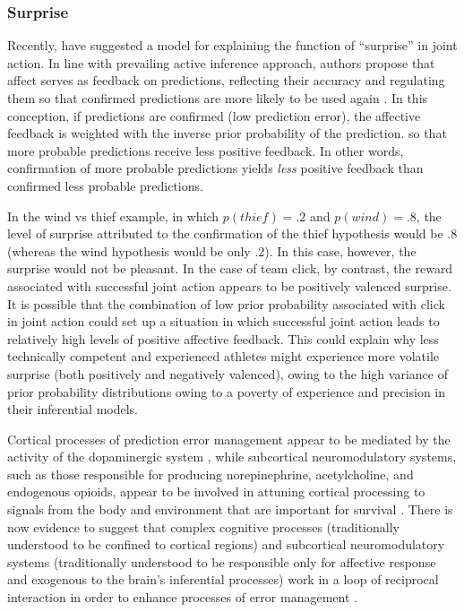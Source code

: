\begin{CJK}{UTF8}{gbsn}
\subsubsection{Surprise}
Recently, \textcite{Chetverikov2016} have suggested a model for explaining the function of ``surprise'' in joint action.  In line with prevailing active inference approach, authors propose that affect serves as feedback on predictions, reflecting their accuracy and regulating them so that confirmed predictions are more likely to be used again \citep{Chetverikov2014}. In this conception, if predictions are confirmed (low prediction error), the affective feedback is weighted with the inverse prior probability of the prediction.
 so that more probable predictions receive less positive feedback. In other words, confirmation of more probable predictions yields \textit{less} positive feedback than confirmed less probable predictions.

In the wind vs thief example, in which $p(thief) = .2$ and $p(wind) = .8$, the level of surprise attributed to the confirmation of the thief hypothesis would be .8 (whereas the wind hypothesis would be only .2).  In this case, however, the surprise would not be pleasant. In the case of team click, by contrast, the reward associated with successful joint action appears to be positively valenced surprise.  It is possible that the combination of low prior probability associated with click in joint action could set up a situation in which successful joint action leads to relatively high levels of positive affective feedback.  This could explain why less technically competent and experienced athletes might experience more volatile surprise (both positively and negatively valenced), owing to the high variance of prior probability distributions owing to a poverty of experience and precision in their inferential models.

Cortical processes of prediction error management appear to be mediated by the activity of the dopaminergic system \citep{Schultz2016}, while subcortical neuromodulatory systems, such as those responsible for producing norepinephrine, acetylcholine, and endogenous opioids, appear to be involved in attuning cortical processing to signals from the body and environment that are important for survival \citep{Lewis2005}.  There is now evidence to suggest that complex cognitive processes (traditionally understood to be confined to cortical regions) and subcortical neuromodulatory systems (traditionally understood to be responsible only for affective response and exogenous to the brain's inferential processes) work in a loop of reciprocal interaction in order to enhance processes of error management \citep{Damasio1994,Lewis2005,Miller2017,Barrett2017}.


\end{CJK}
